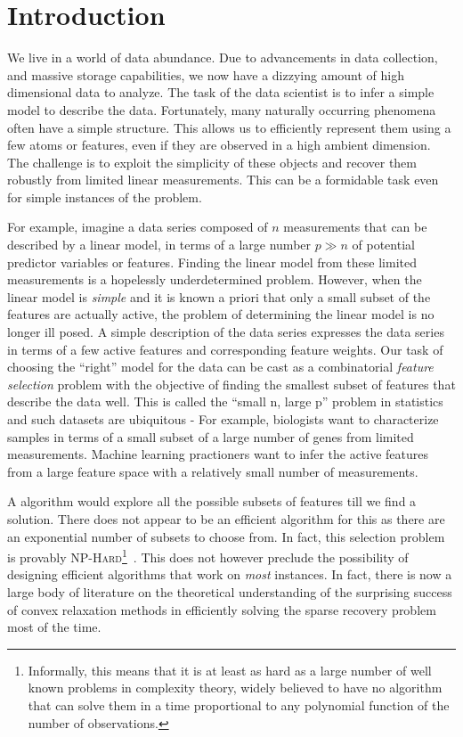 \chapter{Introduction}

We live in a world of data abundance. Due to advancements in data collection,
and massive storage capabilities, we now have a dizzying amount of high
dimensional data to analyze. The task of the data scientist is to infer a simple
model to describe the data. Fortunately, many naturally occurring phenomena
often have a simple structure. This allows us to efficiently represent them
using a few atoms or features, even if they are observed in a high ambient
dimension. The challenge is to exploit the simplicity of these objects and
recover them robustly from limited linear measurements. This can be a formidable
task even for simple instances of the problem.

For example, imagine a data series composed of $n$ measurements that can be
described by a linear model, in terms of a large number $p \gg n$ of potential
predictor variables or features. Finding the linear model from these limited
measurements is a hopelessly underdetermined problem. However, when the linear
model is \emph{simple} and it is known a priori that only a small subset of the
features are actually active, the problem of determining the linear model is no
longer ill posed. A simple description of the data series expresses the data
series in terms of a few active features and corresponding feature weights. Our
task of choosing the ``right'' model for the data can be cast as a combinatorial
\emph{feature selection} problem with the objective of finding the smallest
subset of features that describe the data well. This is called the ``small n,
large p'' problem in statistics and such datasets are ubiquitous - For example,
biologists want to characterize samples in terms of a small subset of a large
number of genes from limited measurements. Machine learning practioners want to
infer the active features from a large feature space with a relatively small
number of measurements.

A \naive algorithm would explore all the possible subsets of features till we
find a solution. There does not appear to be an efficient algorithm for this as
there are an exponential number of subsets to choose from. In fact, this
selection problem is provably \textsc{NP-Hard}\footnote{Informally, this means
that it is at least as hard as a large number of well known problems in
complexity theory, widely believed to have no algorithm that can solve them in a
time proportional to any polynomial function of the number of
observations.}~\cite{Natarajan95}. This does not however preclude the
possibility of designing efficient algorithms that work on \emph{most}
instances. In fact, there is now a large body of literature on the theoretical
understanding of the surprising success of convex relaxation methods in
efficiently solving the sparse recovery problem most of the time.

